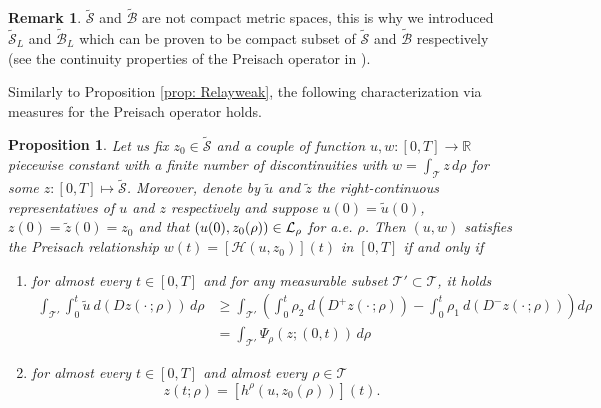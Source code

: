 \documentclass[12pt]{article}
\newcommand{\R}{\mathbb{R}}
\newcommand{\HM}{\mathcal{H}}
\newcommand{\LL}{\mathcal{L}}
\newcommand{\T}{\mathcal{T}}
\newcommand{\p}{\rho}
\newcommand{\1}{\mathds{1}}
\newtheorem{prop}[teo]{Proposition}
\theoremstyle{definition}
\newtheorem{rmk}[teo]{Remark}
\begin{document}
\begin{rmk}
    $\tilde{\mathcal{S}}$ and $\tilde{\mathcal B}$ are not compact metric spaces, this is why we introduced $\tilde{\mathcal S}_L$ and $\tilde{\mathcal B}_L$ which can be proven to be compact subset of $\tilde{\mathcal S}$ and $\tilde{\mathcal B}$ respectively (see the continuity properties of the Preisach operator in \cite[Chapter~IV]{AVH}).
\end{rmk}

Similarly to Proposition \ref{prop: Relayweak}, the following characterization via measures for the Preisach operator holds.

\begin{prop} \label{prop: preisweak}
    Let us fix $z_0 \in \tilde{\mathcal S}$ and a couple of function $u,w: [0,T] \to \R$ piecewise constant with a finite number of discontinuities with $w=\int_\T z\,d\p$ for some $z:[0,T] \mapsto \tilde{\mathcal S}$. Moreover, denote by $\tilde{u}$ and $\tilde{z}$ the right-continuous representatives of $u$ and $z$ respectively and suppose $u(0)=\tilde{u}(0)$, $z(0)=\tilde{z}(0)=z_0$ and that $(u(0),z_0(\rho))\in{\cal \LL_\p}$ for a.e. $\p$. Then $(u,w)$ satisfies the Preisach relationship $w(t)=[\HM(u,z_0)](t)$ in $[0,T]$ if and only if \begin{enumerate}[1)]
        \item for almost every $t\in [0,T]$ and for any measurable subset $\T'\subset\T$, it holds 
        \begin{equation}\label{eq: preisweak1}\begin{split}
            \int_{\T'} \int_{0}^{t} \tilde{u} ~d(Dz(\cdot\,;\p))\, d\p&\geq \int_{\T'}\left(\int_{0}^{t} \p_2 ~d(D^+z(\cdot\,;\p))-\int_{0}^{t} \p_1 ~d(D^-z(\cdot\,;\p))\right) d\p\\&= \int_{\T'} \Psi_\p(z;(0,t))\,d\p
            \end{split}
        \end{equation}
        \item for almost every $t\in [0,T]$ and almost every $\p\in\T$\begin{equation}\label{eq: preisweak2}
         z(t;\p)=[h^\p(u,z_0(\p))](t).\end{equation}
    \end{enumerate}
\end{prop}
\end{document}

